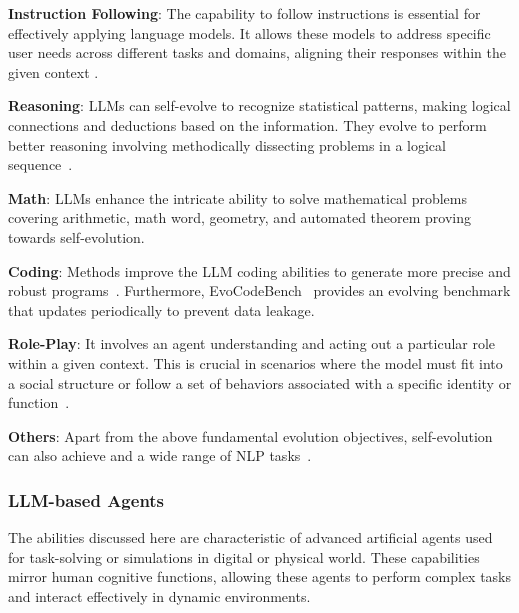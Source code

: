 \documentclass[sn-basic, Numbered]{sn-jnl}%
\theoremstyle{thmstyleone}%
\theoremstyle{thmstyletwo}%
\theoremstyle{thmstylethree}%
\begin{document}
\noindent\textbf{Instruction Following}: The capability to follow instructions is essential for effectively applying language models. It allows these models to address specific user needs across different tasks and domains, aligning their responses within the given context \cite{xu2023wizardlm}.

\noindent\textbf{Reasoning}: LLMs can self-evolve to recognize statistical patterns, making logical connections and deductions based on the information. They evolve to perform better reasoning involving methodically dissecting problems in a logical sequence~\cite{cui2023ada}.

\noindent\textbf{Math}: LLMs enhance the intricate ability to solve mathematical problems covering arithmetic, math word, geometry, and automated theorem proving~\cite{ahn2024large} towards self-evolution. 

\noindent\textbf{Coding}: Methods improve the LLM coding abilities to generate more precise and robust programs~\cite{singh2023beyond, zelikman2023self}. Furthermore, EvoCodeBench~\cite{li2024evocodebench} provides an evolving benchmark that updates periodically to prevent data leakage.

\noindent\textbf{Role-Play}: 
It involves an agent understanding and acting out a particular role within a given context. This is crucial in scenarios where the model must fit into a social structure or follow a set of behaviors associated with a specific identity or function~\cite{lu2024large}. 

\noindent\textbf{Others}: Apart from the above fundamental evolution objectives, self-evolution can also achieve and a wide range of NLP tasks~\cite{stammer2023learning, koa2024learning, gulcehre2023reinforced, zhang2024sciglm, zhang2024selfcontrast}. 


\subsubsection{LLM-based Agents}
The abilities discussed here are characteristic of advanced artificial agents used for task-solving or simulations in digital or physical world. These capabilities mirror human cognitive functions, allowing these agents to perform complex tasks and interact effectively in dynamic environments.
\end{document}
